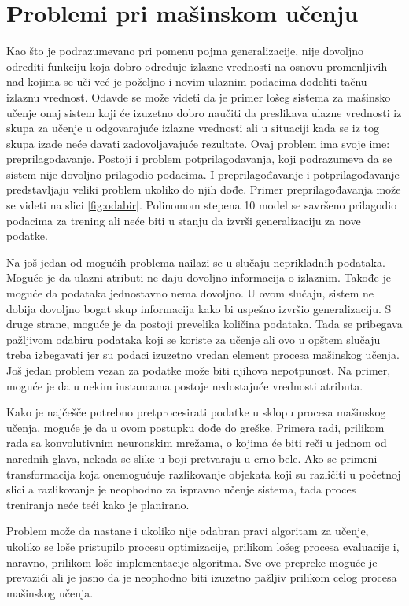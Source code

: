 \section{Problemi pri mašinskom učenju}


Kao što je podrazumevano pri pomenu pojma generalizacije, nije dovoljno odrediti funkciju koja dobro određuje izlazne vrednosti na osnovu promenljivih nad kojima se uči već je poželjno i novim ulaznim podacima dodeliti tačnu izlaznu vrednost. Odavde se može videti da je primer lošeg sistema za mašinsko učenje onaj sistem koji će izuzetno dobro naučiti da preslikava ulazne vrednosti iz skupa za učenje u odgovarajuće izlazne vrednosti ali u situaciji kada se iz tog skupa izađe neće davati zadovoljavajuće rezultate. Ovaj problem ima svoje ime: preprilagođavanje. Postoji i problem potprilagođavanja, koji podrazumeva da se sistem nije dovoljno prilagodio podacima. I preprilagođavanje i potprilagođavanje predstavljaju veliki problem ukoliko do njih dođe. Primer preprilagođavanja može se videti na slici \ref{fig:odabir}. Polinomom stepena 10 model se savršeno prilagodio podacima za trening ali neće biti u stanju da izvrši generalizaciju za nove podatke. \par
Na još jedan od mogućih problema nailazi se u slučaju neprikladnih podataka. Moguće je da ulazni atributi ne daju dovoljno informacija o izlaznim. Takođe je moguće da podataka jednostavno nema dovoljno. U ovom slučaju, sistem ne dobija dovoljno bogat skup informacija kako bi uspešno izvršio generalizaciju. S druge strane, moguće je da postoji prevelika količina podataka. Tada se pribegava pažljivom odabiru podataka koji se koriste za učenje ali ovo u opštem slučaju  treba izbegavati jer su podaci izuzetno vredan element procesa mašinskog učenja. Još jedan problem vezan za podatke može biti njihova nepotpunost. Na primer, moguće je da u nekim instancama postoje nedostajuće vrednosti atributa. \par
Kako je najčešče potrebno pretprocesirati podatke u sklopu procesa mašinskog učenja, moguće je da u ovom postupku dođe do greške. Primera radi, prilikom rada sa konvolutivnim neuronskim mrežama, o kojima će biti reči u jednom od narednih glava, nekada se slike  u boji pretvaraju u crno-bele. Ako se primeni transformacija koja onemogućuje razlikovanje objekata koji su različiti u početnoj slici a razlikovanje je neophodno za ispravno učenje sistema, tada proces treniranja neće teći kako je planirano. \par


Problem može da nastane i ukoliko nije odabran pravi algoritam za učenje, ukoliko se loše pristupilo procesu optimizacije, prilikom lošeg procesa evaluacije i, naravno, prilikom loše implementacije algoritma. Sve ove prepreke moguće je prevazići ali je jasno da je neophodno biti izuzetno pažljiv prilikom celog procesa mašinskog učenja.